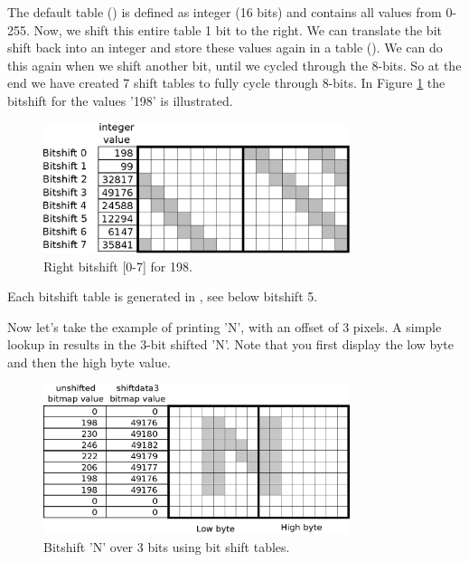 \documentclass[book.tex]{subfiles}
\begin{document}
The default table () is defined as integer (16 bits) and contains all values from 0-255. Now, we shift this entire table 1 bit to the right. We can translate the bit shift back into an integer and store these values again in a table (). We can do this again when we shift another bit, until we cycled through the 8-bits. So at the end we have created 7 shift tables to fully cycle through 8-bits. In Figure \ref{fig:shiftttable} the bitshift for the values '198' is illustrated.
\begin{figure}[H]
\centering
 \includegraphics[width=0.8\textwidth]{imgs/drawings/shift_tables.eps}
 \caption{Right bitshift [0-7] for 198.}
 \label{fig:shiftttable}
 \end{figure}
 \par

Each bitshift table is generated in , see below bitshift 5. \\
\begin{minipage}{\textwidth}
  
\end{minipage}
\label{wallclip_array}
\par
 

Now let's take the example of printing 'N', with an offset of 3 pixels. A simple lookup in  results in the 3-bit shifted 'N'. Note that you first display the low byte and then the high byte value. \\
\begin{figure}[H]
\centering
 \includegraphics[width=0.8\textwidth]{imgs/drawings/text_bitshift_N.eps}
 \caption{Bitshift 'N' over 3 bits using bit shift tables.}
 \label{fig:text_bitshift_N}
 \end{figure}
 \par
\end{document}
